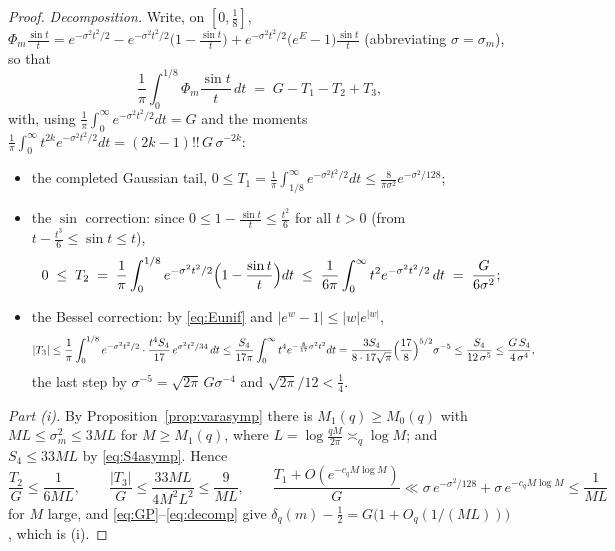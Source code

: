 \documentclass[11pt]{article}
\begin{document}
\begin{proof}
\emph{Decomposition.} Write, on $[0,\tfrac18]$,
$\Phi_m\frac{\sin t}t
=e^{-\sigma^2t^2/2}
-e^{-\sigma^2t^2/2}\bigl(1-\tfrac{\sin t}t\bigr)
+e^{-\sigma^2t^2/2}\bigl(e^{E}-1\bigr)\tfrac{\sin t}t$
(abbreviating $\sigma=\sigma_m$), so that
\begin{equation}\label{eq:decomp}
\frac1\pi\int_0^{1/8}\Phi_m\frac{\sin t}t\,dt
\;=\;G-T_1-T_2+T_3 ,
\end{equation}
with, using $\frac1\pi\int_0^\infty e^{-\sigma^2t^2/2}dt=G$ and the
moments $\frac1\pi\int_0^\infty t^{2k}e^{-\sigma^2t^2/2}dt
=(2k-1)!!\,G\,\sigma^{-2k}$:
\begin{itemize}
\item[$T_1$:] the completed Gaussian tail,
$0\le T_1=\frac1\pi\int_{1/8}^\infty e^{-\sigma^2t^2/2}dt
\le\frac{8}{\pi\sigma^2}e^{-\sigma^2/128}$;
\item[$T_2$:] the $\sin$ correction: since
$0\le1-\frac{\sin t}t\le\frac{t^2}6$ for all $t>0$ (from
$t-\frac{t^3}6\le\sin t\le t$),
\[
0\;\le\;T_2\;=\;\frac1\pi\int_0^{1/8}
e^{-\sigma^2t^2/2}\Bigl(1-\frac{\sin t}t\Bigr)dt
\;\le\;\frac1{6\pi}\int_0^{\infty}t^2e^{-\sigma^2t^2/2}\,dt
\;=\;\frac{G}{6\sigma^{2}} ;
\]
\item[$T_3$:] the Bessel correction: by \eqref{eq:Eunif} and
$|e^w-1|\le|w|e^{|w|}$,
\[
|T_3|\le\frac1\pi\int_0^{1/8}e^{-\sigma^2t^2/2}
\cdot\frac{t^4S_4}{17}\,e^{\sigma^2t^2/34}\,dt
\le\frac{S_4}{17\pi}\int_0^\infty t^4e^{-\frac{8}{17}\sigma^2t^2}dt
=\frac{3S_4}{8\cdot17\sqrt\pi}
\Bigl(\frac{17}{8}\Bigr)^{5/2}\sigma^{-5}
\le\frac{S_4}{12\,\sigma^{5}}\le\frac{G\,S_4}{4\,\sigma^{4}} ,
\]
the last step by $\sigma^{-5}=\sqrt{2\pi}\,G\sigma^{-4}$ and
$\sqrt{2\pi}/12<\tfrac14$.
\end{itemize}

\emph{Part (i).} By Proposition~\ref{prop:varasymp} there is
$M_1(q)\ge M_0(q)$ with
$ML\le\sigma_m^2\le3ML$ for $M\ge M_1(q)$, where
$L=\log\tfrac{qM}{2\pi}\asymp_q\log M$; and
$S_4\le33ML$ by \eqref{eq:S4asymp}. Hence
\[
\frac{T_2}{G}\le\frac1{6ML},\qquad
\frac{|T_3|}{G}\le\frac{33ML}{4M^2L^2}\le\frac{9}{ML},\qquad
\frac{T_1+O(e^{-c_qM\log M})}{G}
\ll\sigma\,e^{-\sigma^2/128}+\sigma\,e^{-c_qM\log M}
\le\frac1{ML}
\]
for $M$ large, and \eqref{eq:GP}--\eqref{eq:decomp} give
$\delta_q(m)-\tfrac12=G\bigl(1+O_q(1/(ML))\bigr)$, which is (i).


\end{proof}
\end{document}
